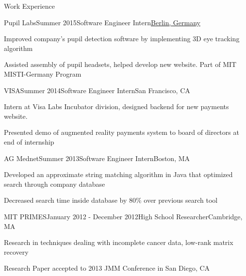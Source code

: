 \documentclass{resume} %
\begin{document}
\begin{rSection}{Work Experience}

\begin{rSubsection}{Pupil Labs}{Summer 2015}{Software Engineer Intern}{\underline{Berlin, Germany}}
\item Improved company's pupil detection software by implementing 3D eye tracking algorithm
\item Assisted assembly of pupil headsets, helped develop new website. Part of MIT MISTI-Germany Program
\end{rSubsection}


\begin{rSubsection}{VISA}{Summer 2014}{Software Engineer Intern}{San Francisco, CA}
\item Intern at Visa Labs Incubator division, designed backend for new payments website. 
\item Presented demo of augmented reality payments system to board of directors at end of internship
\end{rSubsection}


\begin{rSubsection}{AG Mednet}{Summer 2013}{Software Engineer Intern}{Boston, MA}
\item Developed an approximate string matching algorithm in Java that optimized search through company database
\item Decreased search time inside database by 80\% over previous search tool
\end{rSubsection}


\begin{rSubsection}{MIT PRIMES}{January 2012 - December 2012}{High School Researcher}{Cambridge, MA}
\item Research in techniques dealing with incomplete cancer data, low-rank matrix recovery
\item Research Paper accepted to 2013 JMM Conference in San Diego, CA
\end{rSubsection}

\end{rSection}

\end{document}
